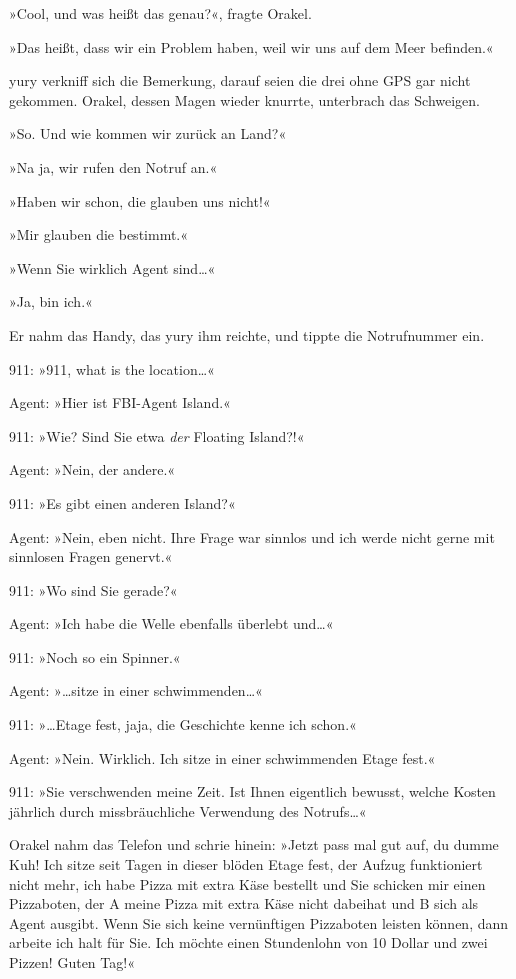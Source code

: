»Cool, und was heißt das genau?«, fragte Orakel.

»Das heißt, dass wir ein Problem haben, weil wir uns auf dem Meer befinden.«

yury verkniff sich die Bemerkung, darauf seien die drei ohne GPS gar nicht gekommen. Orakel, dessen Magen wieder knurrte, unterbrach das Schweigen.

»So. Und wie kommen wir zurück an Land?«

»Na ja, wir rufen den Notruf an.«

»Haben wir schon, die glauben uns nicht!«

»Mir glauben die bestimmt.«

»Wenn Sie wirklich Agent sind…«

»Ja, bin ich.«

Er nahm das Handy, das yury ihm reichte, und tippte die Notrufnummer ein.

911: »911, what is the location…«

Agent: »Hier ist FBI-Agent Island.«

911: »Wie? Sind Sie etwa \textit{der} Floating Island?!«

Agent: »Nein, der andere.«

911: »Es gibt einen anderen Island?«

Agent: »Nein, eben nicht. Ihre Frage war sinnlos und ich werde nicht gerne mit sinnlosen Fragen genervt.«

911: »Wo sind Sie gerade?«

Agent: »Ich habe die Welle ebenfalls überlebt und…«

911: »Noch so ein Spinner.«

Agent: »…sitze in einer schwimmenden…«

911: »…Etage fest, jaja, die Geschichte kenne ich schon.«

Agent: »Nein. Wirklich. Ich sitze in einer schwimmenden Etage fest.«

911: »Sie verschwenden meine Zeit. Ist Ihnen eigentlich bewusst, welche Kosten jährlich durch missbräuchliche Verwendung des Notrufs…«

Orakel nahm das Telefon und schrie hinein: »Jetzt pass mal gut auf, du dumme Kuh! Ich sitze seit Tagen in dieser blöden Etage fest, der Aufzug funktioniert nicht mehr, ich habe Pizza mit extra Käse bestellt und Sie schicken mir einen Pizzaboten, der A meine Pizza mit extra Käse nicht dabeihat und B sich als Agent ausgibt. Wenn Sie sich keine vernünftigen Pizzaboten leisten können, dann arbeite ich halt für Sie. Ich möchte einen Stundenlohn von 10 Dollar und zwei Pizzen! Guten Tag!«

